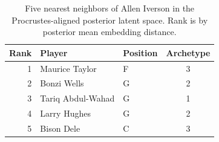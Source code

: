 \begin{table}[htbp]
  \centering\small
  \begin{tabular}{rllc}
    \toprule
    Rank & Player & Position & Archetype \\
    \midrule
    1 & Maurice Taylor & F & 3 \\
    2 & Bonzi Wells & G & 2 \\
    3 & Tariq Abdul-Wahad & G & 1 \\
    4 & Larry Hughes & G & 2 \\
    5 & Bison Dele & C & 3 \\
    \bottomrule
  \end{tabular}
  \caption{Five nearest neighbors of Allen Iverson in the Procrustes-aligned posterior latent space. Rank is by posterior mean embedding distance.}
  \label{tab:Allen_Iverson_neighbors}
\end{table}

